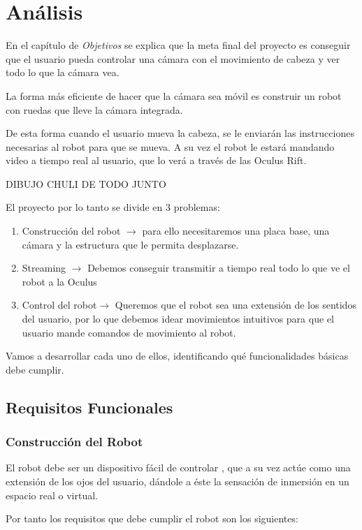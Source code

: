 \documentclass[twoside, 12pt]{epstfg}
\begin{document}
\section{Análisis}
En el capítulo de \textit{Objetivos} se explica que la meta final del proyecto es conseguir que el usuario pueda controlar una cámara con el movimiento de cabeza y ver todo lo que la cámara vea.

La forma más eficiente de hacer que la cámara sea móvil es construir un robot con ruedas que lleve la cámara integrada. 

De esta forma cuando el usuario mueva la cabeza, se le enviarán las instrucciones necesarias al robot para que se mueva. A su vez el robot le estará mandando video a tiempo real al usuario, que lo verá a través de las Oculus Rift.

DIBUJO CHULI DE TODO JUNTO

El proyecto por lo tanto se divide en 3 problemas:
\begin{enumerate}
	\item Construcción del robot $\rightarrow$ para ello necesitaremos una placa base, una cámara y la estructura que le permita desplazarse.
	\item Streaming $\rightarrow$ Debemos conseguir transmitir a tiempo real todo lo que ve el robot a la Oculus
	\item Control del robot$\rightarrow$ Queremos que el robot sea una extensión de los sentidos del usuario, por lo que debemos idear movimientos intuitivos para que el usuario mande comandos de movimiento al robot.
\end{enumerate}

Vamos a desarrollar cada uno de ellos, identificando qué funcionalidades básicas debe cumplir.

\subsection{Requisitos Funcionales}

\subsubsection{Construcción del Robot}


El robot debe ser un dispositivo fácil de controlar , que a su vez actúe como una extensión de los ojos del usuario, dándole a éste la sensación de inmersión en un espacio real o virtual.

Por tanto los requisitos que debe cumplir el robot son los siguientes:
\end{document}
